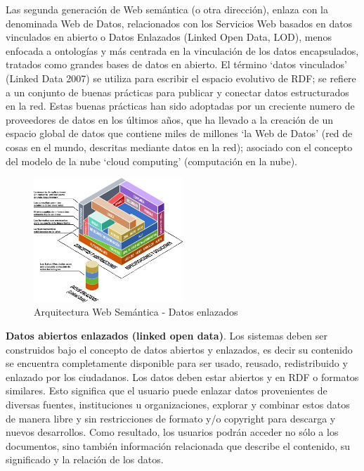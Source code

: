 \documentclass[conference]{IEEEtran}
\begin{document}
    Las segunda generación de Web semántica (o otra dirección), enlaza con la denominada Web de Datos, relacionados con los Servicios Web basados en datos vinculados en abierto o  Datos Enlazados (Linked Open Data, LOD), menos enfocada a ontologías y más centrada en la vinculación de los datos encapsulados, tratados como grandes bases de datos en abierto.  El término ‘datos vinculados’ (Linked Data 2007) se utiliza para escribir el espacio evolutivo de RDF; se refiere a un conjunto de buenas prácticas para publicar y conectar datos estructurados en la red. Estas buenas prácticas han sido adoptadas por un creciente numero de proveedores de datos en los últimos años, que ha llevado a la creación de un espacio global de datos que contiene miles de millones ‘la Web de Datos’ (red de cosas en el mundo, descritas mediante datos en la red); asociado con el concepto del modelo de la nube ‘cloud computing’ (computación en la nube).
    \begin{figure}[h]
    	\centering
    	\includegraphics[width=0.5\textwidth]{ws-arquitectura1}
    	\caption{Arquitectura Web Semántica - Datos enlazados}
    \end{figure}
    \textbf{Datos abiertos enlazados (linked open data)}. Los sistemas deben ser construidos bajo el concepto de datos abiertos y enlazados, es decir su contenido se encuentra completamente disponible para ser usado, reusado, redistribuido y enlazado por los ciudadanos. Los datos deben estar abiertos y en RDF o formatos similares. Esto significa que el usuario puede enlazar datos provenientes de diversas fuentes, instituciones u organizaciones, explorar y combinar estos datos de manera libre y sin restricciones de formato y/o copyright para descarga y nuevos desarrollos. Como resultado, los usuarios podrán acceder no sólo a los documentos, sino también información relacionada que describe el contenido, su significado y la relación de los datos. 
    
        
\end{document}
